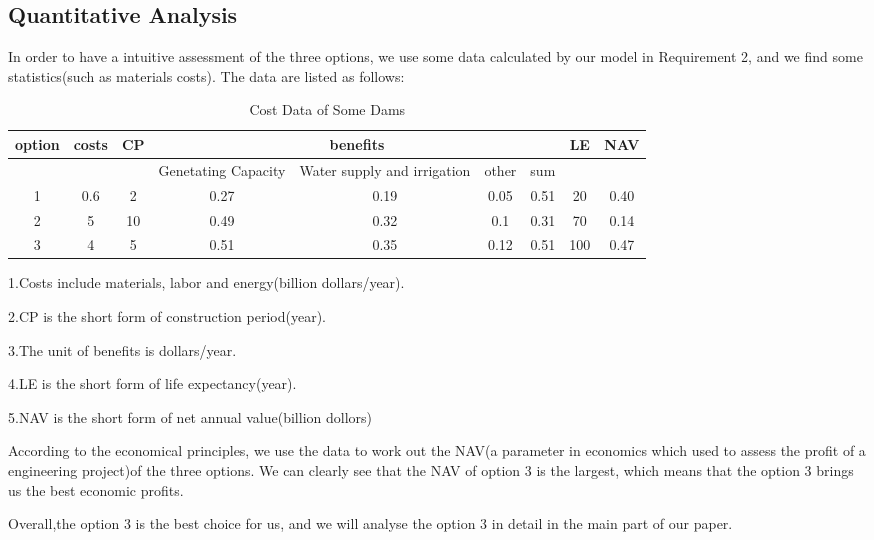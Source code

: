 \documentclass[12pt]{article}%
\begin{document}
\subsection{Quantitative Analysis}
In order to have a intuitive assessment of the three options, we use some data calculated by our model in Requirement 2, and we find some statistics(such as materials costs). The data are listed as follows:
\begin{table}[H]
	\centering 
	\footnotesize 
	\caption{Cost Data of Some Dams}
	\label{complex}
	\begin{tabular}{|ccccccccc|}
	\hline
option & costs & CP & \multicolumn{4}{c}{benefits} & LE & NAV \\
\hline
   &  &  & Genetating Capacity & Water supply and irrigation & other & sum & & \\
\hline
1  &  0.6  &  2  &  0.27  &  0.19  &  0.05  &  0.51  &  20  &  0.40\\
\hline
2  &  5  &  10  &  0.49  &  0.32  &  0.1  &  0.31  &  70  &  0.14\\
\hline
3  &  4  &  5  &  0.51  &  0.35  &  0.12  &  0.51  &  100  &  0.47\\
\hline
\end{tabular}
\begin{tablenotes}
        \footnotesize
        \item 1.Costs include materials, labor and energy(billion dollars/year).
		\item 2.CP is the short form of construction period(year).
		\item 3.The unit of benefits is dollars/year. 
		\item 4.LE is the short form of life expectancy(year).
		\item 5.NAV is the short form of net annual value(billion dollors)
      \end{tablenotes}
\end{table} 
\noindent
According to the economical principles, we use the data to work out the NAV(a parameter in economics which used to assess the profit of a engineering project)of the three options. We can clearly see that the NAV of option 3 is the largest, which means that the option 3 brings us the best economic profits.
\par\noindent
\par\noindent
\par\noindent
Overall,the option 3 is the best choice for us, and we will analyse the option 3 in detail in the main part of our paper.
\end{document}
